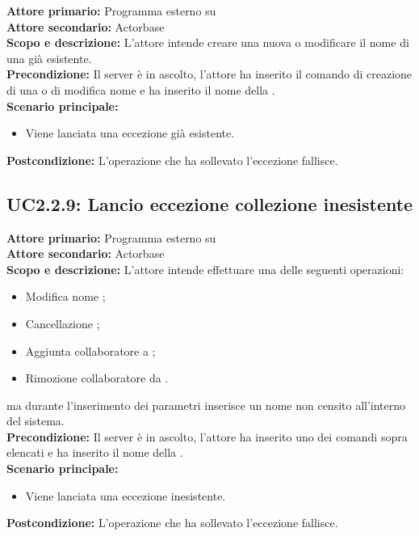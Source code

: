 \documentclass{scalatekids-article}
\begin{document}
\textbf{Attore primario:} Programma esterno su \\
\textbf{Attore secondario:} Actorbase\\
\textbf{Scopo e descrizione:} L'attore intende creare una nuova  o modificare il nome di una già esistente.\\
\textbf{Precondizione:} Il server è in ascolto, l'attore ha inserito il comando di creazione di una  o di modifica nome  e ha inserito il nome della .\\
\textbf{Scenario principale:}
\begin{itemize}
\item Viene lanciata una eccezione  già esistente.
\end{itemize}
\textbf{Postcondizione:} L'operazione che ha sollevato l'eccezione fallisce.

\subsection{UC2.2.9: Lancio eccezione collezione inesistente}

\textbf{Attore primario:} Programma esterno su \\
\textbf{Attore secondario:} Actorbase\\
\textbf{Scopo e descrizione:} L'attore intende effettuare una delle seguenti operazioni:
\begin{itemize}
\item Modifica nome ;
\item Cancellazione ;
\item Aggiunta collaboratore a ;
\item Rimozione collaboratore da .
\end{itemize}
ma durante l'inserimento dei parametri inserisce un nome  non censito all'interno del sistema.\\
\textbf{Precondizione:} Il server è in ascolto, l'attore ha inserito uno dei comandi sopra elencati e ha inserito il nome della  .\\
\textbf{Scenario principale:}
\begin{itemize}
\item Viene lanciata una eccezione  inesistente.
\end{itemize}
\textbf{Postcondizione:} L'operazione che ha sollevato l'eccezione fallisce.
\end{document}

